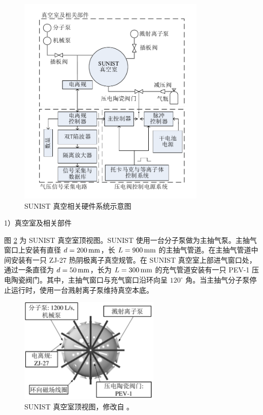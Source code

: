 \begin{figure}
  \centering
  \includegraphics[width=0.8\textwidth]{vacuum-system-4.pdf}
  \caption{SUNIST 真空相关硬件系统示意图}
  \label{fig:chap04:vacuum-system}
\end{figure}

1）真空室及相关部件

图 \ref{fig:chap04:topview-vacuum-vessel} 为 SUNIST 真空室顶视图。SUNIST 使用一台分子泵做为主抽气泵。主抽气窗口上安装有直径 $d=200\,{\rm mm}$，长 $L=900\,{\rm mm}$ 的主抽气管道。在主抽气管道中间安装有一只 ZJ-27\cite{ZJ-27} 热阴极离子真空规管。在 SUNIST 真空室上部进气窗口处，通过一条直径为 $d=50\,{\rm mm}$，长为 $L=300\,{\rm mm}$ 的充气管道安装有一只 PEV-1\cite{PEV-1} 压电陶瓷阀门。其中，主抽气窗口与充气窗口沿环向呈 $120^\circ$ 角。当主抽气分子泵停止运行时，使用一台溅射离子泵维持真空本底。

\begin{figure}
  \centering
  \includegraphics[width=0.6\textwidth]{topview-vacuum-vessel.pdf}
  \caption{SUNIST 真空室顶视图，修改自 。}
  \label{fig:chap04:topview-vacuum-vessel}
\end{figure}


